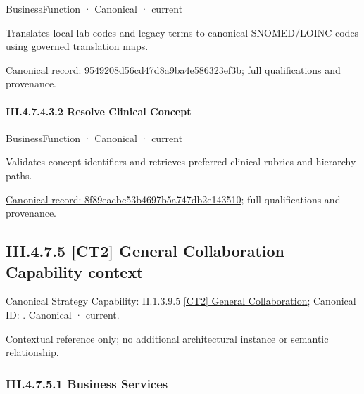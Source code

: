 \label{element:9549208d56cd47d8a9ba4e586323ef3b}
{\small BusinessFunction · Canonical · current}\par

Translates local lab codes and legacy terms to canonical SNOMED/LOINC codes using governed translation maps.


{\footnotesize \href{../../../../../../../continuum/business/business-function/9549208d56cd47d8a9ba4e586323ef3b.md}{Canonical record: 9549208d56cd47d8a9ba4e586323ef3b}; full qualifications and provenance.}\par
\paragraph*{III.4.7.4.3.2 Resolve Clinical Concept}
\label{navigation:III.4.7.4.3.2}

\label{element:8f89eacbc53b4697b5a747db2e143510}
{\small BusinessFunction · Canonical · current}\par

Validates concept identifiers and retrieves preferred clinical rubrics and hierarchy paths.


{\footnotesize \href{../../../../../../../continuum/business/business-function/8f89eacbc53b4697b5a747db2e143510.md}{Canonical record: 8f89eacbc53b4697b5a747db2e143510}; full qualifications and provenance.}\par
\subsection*{III.4.7.5 [CT2] General Collaboration — Capability context}
\label{navigation:III.4.7.5}

{\small Canonical Strategy Capability: II.1.3.9.5 \hyperref[element:3bb740e6db284112b054905c0c6c80be]{[CT2] General Collaboration}; Canonical ID: \texttt{}. Canonical · current.}\par
Contextual reference only; no additional architectural instance or semantic relationship.\par
\subsubsection*{III.4.7.5.1 Business Services}
\label{navigation:III.4.7.5.1}

